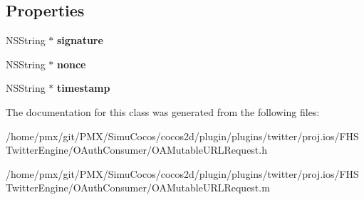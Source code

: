 \subsection*{Properties}
\begin{DoxyCompactItemize}
\item 
\mbox{\label{interfaceOAMutableURLRequest_aec56e7e8ba26d1240f3b3b16a9f0571e}} 
N\+S\+String $\ast$ {\bfseries signature}
\item 
\mbox{\label{interfaceOAMutableURLRequest_a5340652351a3f336c537c02239a88094}} 
N\+S\+String $\ast$ {\bfseries nonce}
\item 
\mbox{\label{interfaceOAMutableURLRequest_a3c39d16a008f6745385c499dc5e3e299}} 
N\+S\+String $\ast$ {\bfseries timestamp}
\end{DoxyCompactItemize}


The documentation for this class was generated from the following files\+:\begin{DoxyCompactItemize}
\item 
/home/pmx/git/\+P\+M\+X/\+Simu\+Cocos/cocos2d/plugin/plugins/twitter/proj.\+ios/\+F\+H\+S\+Twitter\+Engine/\+O\+Auth\+Consumer/O\+A\+Mutable\+U\+R\+L\+Request.\+h\item 
/home/pmx/git/\+P\+M\+X/\+Simu\+Cocos/cocos2d/plugin/plugins/twitter/proj.\+ios/\+F\+H\+S\+Twitter\+Engine/\+O\+Auth\+Consumer/O\+A\+Mutable\+U\+R\+L\+Request.\+m\end{DoxyCompactItemize}
